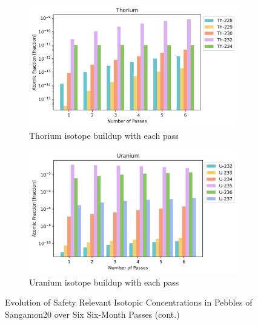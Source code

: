 \begin{figure}[H]\ContinuedFloat
\centering


\begin{subfigure}{0.95\textwidth}
  \includegraphics[width=\linewidth]{figures/compositions/thorium}
  \caption{Thorium isotope buildup with each pass}
  \label{fig:th}
\end{subfigure}%

\begin{subfigure}{0.95\textwidth}
  \includegraphics[width=\linewidth]{figures/compositions/uranium}
  \caption{Uranium isotope buildup with each pass}
  \label{fig:u}
\end{subfigure}%

\caption{Evolution of Safety Relevant Isotopic Concentrations in Pebbles of Sangamon20 over Six Six-Month Passes (cont.)}
\end{figure}

